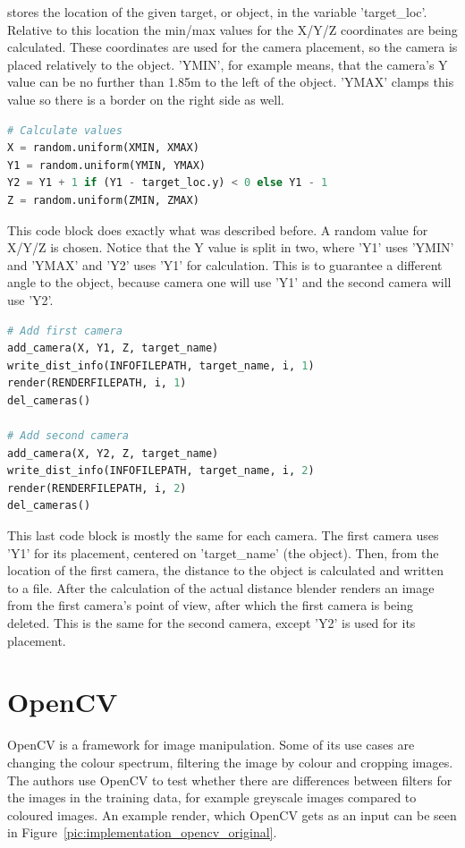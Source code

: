 stores the location of the given target, or object, in the variable 'target\_loc'. Relative to this location the min/max values for the X/Y/Z coordinates are being calculated. These coordinates are used for the camera placement, so the camera is placed relatively to the object. 'YMIN', for example means, that the camera's Y value can be no further than 1.85m to the left of the object. 'YMAX' clamps this value so there is a border on the right side as well.

\begin{lstlisting}[language=python]
# Calculate values
X = random.uniform(XMIN, XMAX)
Y1 = random.uniform(YMIN, YMAX)
Y2 = Y1 + 1 if (Y1 - target_loc.y) < 0 else Y1 - 1
Z = random.uniform(ZMIN, ZMAX)
\end{lstlisting}

This code block does exactly what was described before. A random value for X/Y/Z is chosen. Notice that the Y value is split in two, where 'Y1' uses 'YMIN' and 'YMAX' and 'Y2' uses 'Y1' for calculation. This is to guarantee a different angle to the object, because camera one will use 'Y1' and the second camera will use 'Y2'.

\begin{lstlisting}[language=python]
# Add first camera
add_camera(X, Y1, Z, target_name)
write_dist_info(INFOFILEPATH, target_name, i, 1)
render(RENDERFILEPATH, i, 1)
del_cameras()

# Add second camera
add_camera(X, Y2, Z, target_name)
write_dist_info(INFOFILEPATH, target_name, i, 2)
render(RENDERFILEPATH, i, 2)
del_cameras()
\end{lstlisting}

This last code block is mostly the same for each camera. The first camera uses 'Y1' for its placement, centered on 'target\_name' (the object). Then, from the location of the first camera, the distance to the object is calculated and written to a file. After the calculation of the actual distance blender renders an image from the first camera's point of view, after which the first camera is being deleted. This is the same for the second camera, except 'Y2' is used for its placement.

\section{OpenCV}
OpenCV is a framework for image manipulation. Some of its use cases are changing the colour spectrum, filtering the image by colour and cropping images. The authors use OpenCV to test whether there are differences between filters for the images in the training data, for example greyscale images compared to coloured images. An example render, which OpenCV gets as an input can be seen in Figure~\ref{pic:implementation_opencv_original}.

